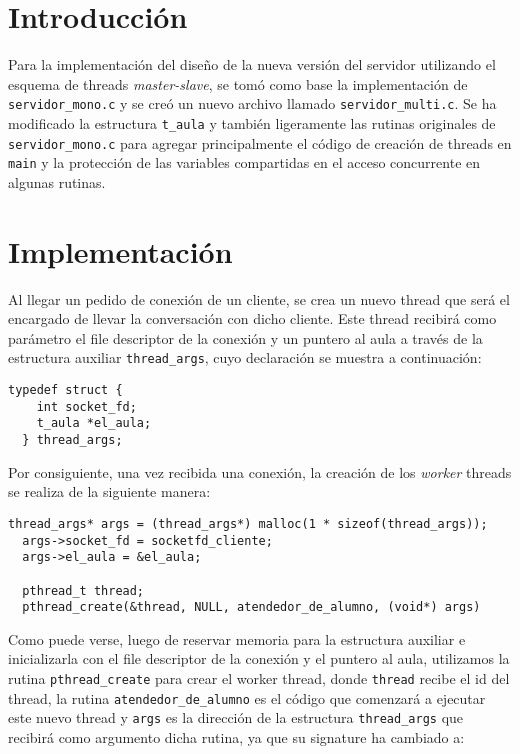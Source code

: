 \section{Introducción}

Para la implementación del diseño de la nueva versión del servidor utilizando el esquema de threads \textit{master-slave}, se tomó como base la implementación de \texttt{servidor\_mono.c} y se creó un nuevo archivo llamado \texttt{servidor\_multi.c}. Se ha modificado la estructura \texttt{t\_aula} y también ligeramente las rutinas originales de \texttt{servidor\_mono.c} para agregar principalmente el código de creación de threads en \texttt{main} y la protección de las variables compartidas en el acceso concurrente en algunas rutinas.

\section{Implementación}

Al llegar un pedido de conexión de un cliente, se crea un nuevo thread que será el encargado de llevar la conversación con dicho cliente. Este thread recibirá como parámetro el file descriptor de la conexión y un puntero al aula a través de la estructura auxiliar \texttt{thread\_args}, cuyo declaración se muestra a continuación:

\begin{lstlisting}[frame=leftline]
  typedef struct {
    int socket_fd;
    t_aula *el_aula;
  } thread_args;
\end{lstlisting}

Por consiguiente, una vez recibida una conexión, la creación de los \textit{worker} threads se realiza de la siguiente manera:

\begin{lstlisting}[frame=leftline]
  thread_args* args = (thread_args*) malloc(1 * sizeof(thread_args));
  args->socket_fd = socketfd_cliente;
  args->el_aula = &el_aula;

  pthread_t thread;
  pthread_create(&thread, NULL, atendedor_de_alumno, (void*) args)
\end{lstlisting}

Como puede verse, luego de reservar memoria para la estructura auxiliar e inicializarla con el file descriptor de la conexión y el puntero al aula, utilizamos la rutina \texttt{pthread\_create} para crear el worker thread, donde \texttt{thread} recibe el id del thread, la rutina \texttt{atendedor\_de\_alumno} es el código que comenzará a ejecutar este nuevo thread y \texttt{args} es la dirección de la estructura \texttt{thread\_args} que recibirá como argumento dicha rutina, ya que su signature ha cambiado a:

